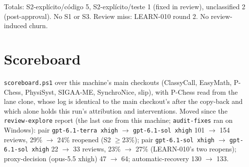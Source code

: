 \documentclass[11pt,a4paper]{article}
\begin{document}
Totals: S2-explícito/código 5, S2-explícito/teste 1 (fixed in review), unclassified 2
(post-approval). No S1 or S3. Review miss: LEARN-010 round 2. No review-induced churn.

\section*{Scoreboard}

\texttt{scoreboard.ps1} over this machine's main checkouts (ClassyCall, EasyMath, P-Chess, PhysiSyst,
SIGAA-ME, SynchroNice, slip), with P-Chess read from the lane clone, whose log is identical to the main
checkout's after the copy-back and which alone holds this run's attribution and interventions. Moved since the
\texttt{review-explore} report (the last one from this machine; \texttt{audit-fixes} ran on Windows):
pair \texttt{gpt-6.1-terra xhigh} $\rightarrow$ \texttt{gpt-6.1-sol xhigh} 101 $\to$ 154 reviews, 29\%
$\to$ 24\% reopened (S2 $\geq$23\%); pair \texttt{gpt-6.1-sol xhigh} $\rightarrow$ \texttt{gpt-6.1-sol xhigh}
22 $\to$ 33 reviews, 23\% $\to$ 27\% (LEARN-010's two reopens); proxy-decision (opus-5.5 xhigh) 47 $\to$ 64;
automatic-recovery 130 $\to$ 133.
\end{document}
